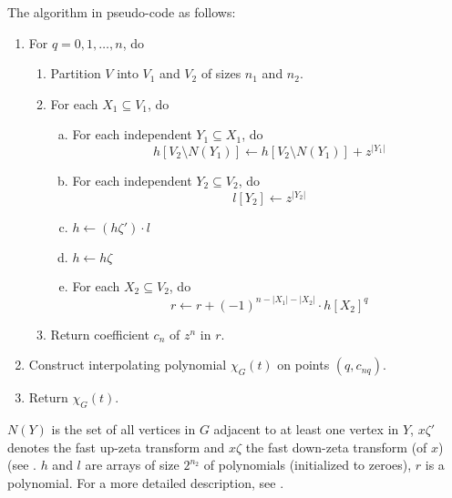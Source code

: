 \documentclass[a4paper]{article}
\begin{document}

The algorithm in pseudo-code as follows:

\begin{enumerate}[{Step} A.]
 \item \label{q} For $q = 0, 1, \ldots, n$, do
 \begin{enumerate}[1.]
  \item Partition $V$ into $V_1$ and $V_2$ of sizes $n_1$ and $n_2$.
  \item \label{step1} For each $X_1 \subseteq V_1$, do
  \begin{enumerate}[a)]
   \item \label{indep1} For each independent $Y_1 \subseteq X_1$, do
$$ h[V_2 \setminus N(Y_1)] \leftarrow h[V_2 \setminus N(Y_1)] + z^{|Y_1|} $$
   \item \label{indep2} For each independent $Y_2 \subseteq V_2$, do
$$ l[Y_2] \leftarrow z^{|Y_2|} $$
   \item $h \leftarrow (h\zeta')\cdot l$
   \item $h \leftarrow h\zeta$
   \item \label{rstep}For each $X_2 \subseteq V_2$, do
$$ r \leftarrow r + (-1)^{n - |X_1| - |X_2|}\cdot h[X_2]^q $$
  \end{enumerate}
  \item Return coefficient $c_n$ of $z^n$ in $r$.
 \end{enumerate}
 \item Construct interpolating polynomial $\chi_G(t)$ on points $(q, c_{nq})$.
 \item Return $\chi_G(t)$.
\end{enumerate}

$N(Y)$ is the set of all vertices in $G$ adjacent to at least one vertex in $Y$, $x\zeta'$ denotes the fast up-zeta transform and $x\zeta$ the fast down-zeta transform (of $x$) (see \cite[sec 2]{cov_pack}. $h$ and $l$ are arrays of size $2^{n_2}$ of polynomials (initialized to zeroes), $r$ is a polynomial. For a more detailed description, see \cite[p 9]{cov_pack}.
\end{document}
